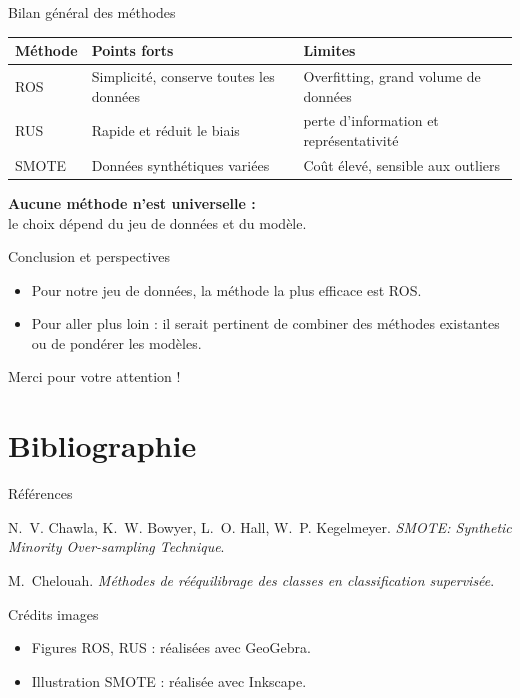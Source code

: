 \documentclass{beamer}
\begin{document}
\begin{frame}{Bilan général des méthodes}
    \centering
    \small
    \begin{tabular}{|l|p{3cm}|p{3cm}|}
        \hline
        \centering
        \textbf{Méthode} & \textbf{Points forts} & \textbf{Limites} \\
        \hline
        \centering
        ROS & Simplicité, conserve toutes les données & Overfitting, grand volume de données \\
        \hline
        \centering
        RUS & Rapide et réduit le biais & perte d'information et représentativité \\
        \hline
        \centering
        SMOTE & Données synthétiques variées & Coût élevé, sensible aux outliers \\
        \hline
    \end{tabular}
    \vspace{0.7cm}

    \textbf{Aucune méthode n’est universelle :}\\
    le choix dépend du jeu de données et du modèle.
\end{frame}

\begin{frame}{Conclusion et perspectives}
    \begin{itemize}
        \item Pour notre jeu de données, la méthode la plus efficace est ROS.\\[0.5cm]
        \item  Pour aller plus loin : il serait pertinent de combiner des méthodes existantes ou de pondérer les modèles.
    \end{itemize}
\end{frame}

\begin{frame}
    \centering
    \Huge Merci pour votre attention !
\end{frame}

\section{Bibliographie}

\begin{frame}[allowframebreaks]{Références}
    \small
    \begin{thebibliography}{9}

    N.~V. Chawla, K.~W. Bowyer, L.~O. Hall, W.~P. Kegelmeyer.
    \newblock \emph{SMOTE: Synthetic Minority Over-sampling Technique}.

    M.~Chelouah.
    \newblock \emph{Méthodes de rééquilibrage des classes en classification supervisée}.

    \end{thebibliography}
    \end{frame}

    \begin{frame}{Crédits images}
      \small
      \begin{itemize}
        \item Figures ROS, RUS : réalisées avec GeoGebra.
        \item Illustration SMOTE : réalisée avec Inkscape.
      \end{itemize}
    \end{frame}
\end{document}
